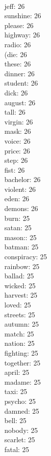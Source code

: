\begin{multicols}{6}
  \\ jeff: 26
  \\ sunshine: 26
  \\ please: 26
  \\ highway: 26
  \\ radio: 26
  \\ (die: 26
  \\ these: 26
  \\ dinner: 26
  \\ student: 26
  \\ dick: 26
  \\ august: 26
  \\ tall: 26
  \\ virgin: 26
  \\ mask: 26
  \\ voice: 26
  \\ price: 26
  \\ step: 26
  \\ fist: 26
  \\ bachelor: 26
  \\ violent: 26
  \\ eden: 26
  \\ demons: 26
  \\ burn: 25
  \\ satan: 25
  \\ mason:: 25
  \\ batman: 25
  \\ conspiracy: 25
  \\ rainbow: 25
  \\ ballad: 25
  \\ wicked: 25
  \\ harvest: 25
  \\ loved: 25
  \\ streets: 25
  \\ autumn: 25
  \\ match: 25
  \\ nation: 25
  \\ fighting: 25
  \\ together: 25
  \\ april: 25
  \\ madame: 25
  \\ taxi: 25
  \\ psycho: 25
  \\ damned: 25
  \\ bell: 25
  \\ nobody: 25
  \\ scarlet: 25
  \\ fatal: 25

\end{multicols}
